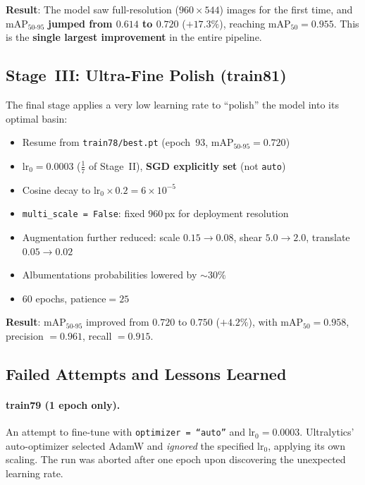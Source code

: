 \documentclass[11pt, a4paper]{article}
\newcommand{\mapfifty}{\text{mAP}_{50}}
\newcommand{\mapfull}{\text{mAP}_{50\text{-}95}}
\begin{document}
\noindent\textbf{Result}: The model saw full-resolution
($960\times544$) images for the first time, and $\mapfull$ \textbf{jumped
  from $0.614$ to $0.720$} ($+17.3\%$), reaching
$\mapfifty = 0.955$.  This is the \textbf{single largest improvement}
in the entire pipeline.

\subsection{Stage~III: Ultra-Fine Polish (train81)}
\label{sec:stage3}

The final stage applies a very low learning rate to ``polish'' the model into
its optimal basin:

\begin{itemize}[leftmargin=*, itemsep=2pt]
  \item Resume from \texttt{train78/best.pt} (epoch~93, $\mapfull = 0.720$)
  \item $\text{lr}_0 = 0.0003$ ($\frac{1}{7}$ of Stage~II),
        \textbf{SGD explicitly set} (not \texttt{auto})
  \item Cosine decay to $\text{lr}_0 \times 0.2 = 6 \times 10^{-5}$
  \item \texttt{multi\_scale = False}: fixed $960$\,px for deployment
        resolution
  \item Augmentation further reduced: scale $0.15 \to 0.08$, shear $5.0 \to 2.0$,
        translate $0.05 \to 0.02$
  \item Albumentations probabilities lowered by ${\sim}30\%$
  \item 60 epochs, patience$= 25$
\end{itemize}

\noindent\textbf{Result}: $\mapfull$ improved from $0.720$ to
$\mathbf{0.750}$ ($+4.2\%$), with $\mapfifty = 0.958$,
precision $= 0.961$, recall $= 0.915$.

\subsection{Failed Attempts and Lessons Learned}
\label{sec:failures}

\paragraph{train79 (1 epoch only).}  An attempt to fine-tune with \texttt{optimizer = ``auto''} and $\text{lr}_0 =
  0.0003$. Ultralytics' auto-optimizer selected AdamW and \emph{ignored} the
specified $\text{lr}_0$, applying its own scaling. The run was aborted after
one epoch upon discovering the unexpected learning rate.
\end{document}
